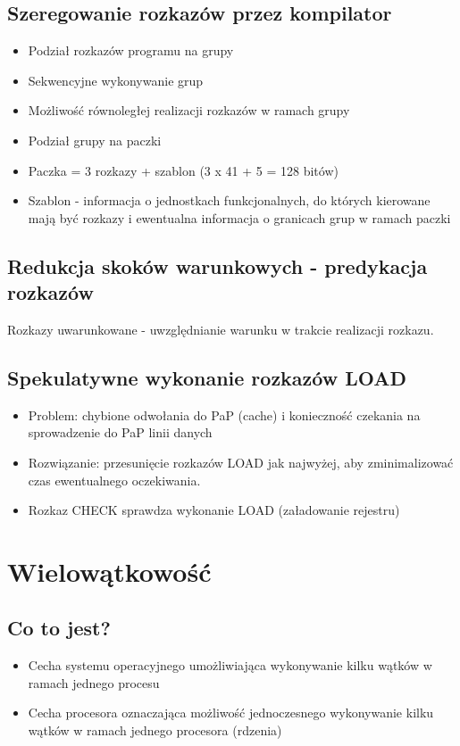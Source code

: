 	\subsection{Szeregowanie rozkazów przez kompilator}
		\begin{itemize}
			\item Podział rozkazów programu na grupy
			\item Sekwencyjne wykonywanie grup
			\item Możliwość równoległej realizacji rozkazów w ramach grupy
			\item Podział grupy na paczki
			\item Paczka = 3 rozkazy + szablon (3 x 41 + 5 = 128 bitów)
			\item Szablon - informacja o jednostkach funkcjonalnych, do których kierowane mają być rozkazy i ewentualna informacja o granicach grup w ramach paczki
		\end{itemize}
	\subsection{Redukcja skoków warunkowych - predykacja rozkazów}
		Rozkazy uwarunkowane - uwzględnianie warunku w trakcie realizacji rozkazu.
	\subsection{Spekulatywne wykonanie rozkazów LOAD}
		\begin{itemize}
			\item Problem: chybione odwołania do PaP (cache) i konieczność czekania na sprowadzenie do PaP linii danych
			\item Rozwiązanie: przesunięcie rozkazów LOAD jak najwyżej, aby zminimalizować czas ewentualnego oczekiwania.
			\item Rozkaz CHECK sprawdza wykonanie LOAD (załadowanie rejestru)
		\end{itemize}
	
\section{Wielowątkowość}
	\subsection{Co to jest?}
		\begin{itemize}
			\item Cecha systemu operacyjnego umożliwiająca wykonywanie kilku wątków w ramach jednego procesu
			\item Cecha procesora oznaczająca możliwość jednoczesnego wykonywanie kilku wątków w ramach jednego procesora (rdzenia)
		\end{itemize}

